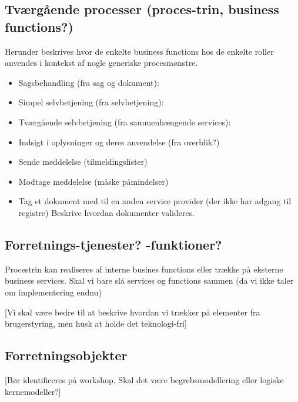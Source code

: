 \subsection{Tværgående processer (proces-trin, business
functions?)}\label{tvuxe6rguxe5ende-processer-proces-trin-business-functions}

Herunder beskrives hvor de enkelte business functions hos de enkelte
roller anvendes i kontekst af nogle generiske procesmønstre.

\begin{itemize}
\tightlist
\item
  Sagsbehandling (fra sag og dokument):
\item
  Simpel selvbetjening (fra selvbetjening):
\item
  Tværgående selvbetjening (fra sammenhængende services):
\item
  Indsigt i oplysninger og deres anvendelse (fra overblik?)
\item
  Sende meddelelse (tilmeldingslister)
\item
  Modtage meddelelse (måske påmindelser)
\item
  Tag et dokument med til en anden service provider (der ikke har adgang
  til registre) Beskrive hvordan dokumenter valideres.
\end{itemize}

\subsection{Forretnings-tjenester?
-funktioner?}\label{forretnings-tjenester--funktioner}

Procestrin kan realiseres af interne busines functions eller trække på
eksterne business services. Skal vi bare slå services og functions
sammen (da vi ikke taler om implementering endnu)

{[}Vi skal være bedre til at beskrive hvordan vi trækker på elementer
fra brugerstyring, men husk at holde det teknologi-fri{]}

\subsection{Forretningsobjekter}\label{forretningsobjekter}

{[}Bør identificeres på workshop. Skal det være begrebsmodellering eller
logiske kernemodeller?{]}

